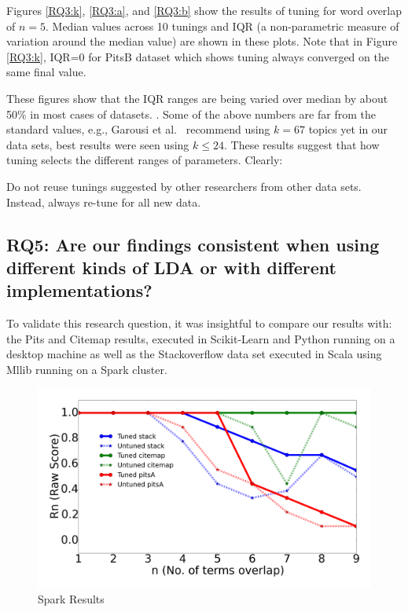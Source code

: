 \documentclass[twocolumn,5p,sort&compress]{elsarticle}
\theoremstyle{break}
\begin{document}
Figures \ref{RQ3:k}, \ref{RQ3:a}, and \ref{RQ3:b} show the results of tuning for word overlap of $n=5$. Median values across 10 tunings and IQR (a non-parametric measure of variation
around the median value) are shown in these plots. Note that in Figure \ref{RQ3:k}, IQR=0 for  PitsB dataset which shows tuning always converged on the same final value.

These figures
show that the IQR ranges are being varied over median by about 50\% in most cases of datasets. . 
Some of the above numbers are far from the standard values, e.g., Garousi et al.~\cite{garousi2016citations} recommend using $k=67$ topics
yet in our data sets, best results were seen using $k \le 24$. These results suggest that how tuning selects the different ranges of parameters.
Clearly:

\begin{lesson}
  Do not  reuse tunings suggested by other researchers from other data sets.
  Instead, always re-tune for all new data.
\end{lesson}

\subsection{\textbf{RQ5}: \textbf{Are our findings consistent when using different kinds of LDA or with different implementations?}}
\label{sect:vem-gibbs}

To validate this research question, it was insightful to compare our results with: the Pits and Citemap results, executed in Scikit-Learn and Python running on a desktop machine as well as the Stackoverflow data set executed in Scala using Mllib running on a Spark cluster.

\begin{figure}[!b]
  \captionsetup{justification=centering}
  \includegraphics[width=\linewidth]{./fig/spark.png}
  \caption{Spark Results}
  \label{python_spark}
\end{figure}
\end{document}
